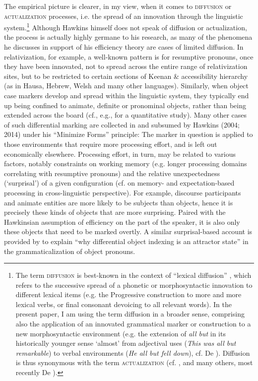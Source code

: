 \documentclass[output=paper]{langsci/langscibook}
\begin{document}
The empirical picture is clearer, in my view, when it comes to \textsc{diffusion} or \textsc{actualization} processes, i.e. the spread of an innovation through the linguistic system.\footnote{The term \textsc{diffusion} is best-known in the context of “lexical diffusion” \citep{Wang1969}, which refers to the successive spread of a phonetic or morphosyntactic innovation to different lexical items (e.g. the Progressive construction to more and more lexical verbs, or final consonant devoicing to all relevant words). In the present paper, I am using the term diffusion in a broader sense, comprising also the application of an innovated grammatical marker or construction to a new morphosyntactic environment (e.g. the extension of \textit{all but} in its historically younger sense ‘almost’ from adjectival uses (\textit{This was all but remarkable}) to verbal environments (\textit{He all but fell down}), cf. De \citealt{Smet2012}). Diffusion is thus synonymous with the term \textsc{actualization} (cf. \citealt{Timberlake1977}, \citealt{Andersen2001} and many others, most recently De \citealt{Smet2012}).} Although Hawkins himself does not speak of diffusion or actualization, the process is actually highly germane to his research, as many of the phenomena he discusses in support of his efficiency theory are cases of limited diffusion. In relativization, for example, a well-known pattern is for resumptive pronouns, once they have been innovated, not to spread across the entire range of relativization sites, but to be restricted to certain sections of Keenan \&  accessibility hierarchy (as in Hausa, Hebrew, Welsh and many other languages). Similarly, when object case markers develop and spread within the linguistic system, they typically end up being confined to animate, definite or pronominal objects, rather than being extended across the board (cf., e.g., \citealt{Sinnemäki2014} for a quantitative study). Many other cases of such differential marking are collected in \citet{Haspelmath2008} and subsumed by Hawkins (2004; 2014) under his “Minimize Forms” principle: The marker in question is applied to those environments that require more processing effort, and is left out economically elsewhere. Processing effort, in turn, may be related to various factors, notably constraints on working memory (e.g. longer processing domains correlating with resumptive pronouns) and the relative unexpectedness (‘surprisal’) of a given configuration (cf. \citealt{NorcliffeEtAl2015} on memory- and expectation-based processing in cross-linguistic perspective). For example, discourse participants and animate entities are more likely to be subjects than objects, hence it is precisely these kinds of objects that are more surprising. Paired with the Hawkinsian assumption of efficiency on the part of the speaker, it is also only these objects that need to be marked overtly. A similar surprisal-based account is provided by \citet{Haig2018} to explain “why differential object indexing is an attractor state” \citep[781]{Haig2018} in the grammaticalization of object pronouns.
\end{document}
